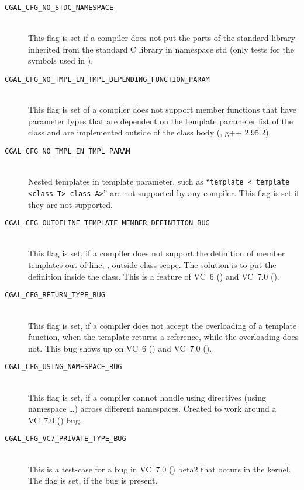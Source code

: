 \begin{description}
\item[{\tt CGAL\_CFG\_NO\_STDC\_NAMESPACE}]~\\ 
  This flag is set if a compiler does not put the parts of the
  standard library inherited from the standard C library in namespace
  {\ccFont std} (only tests for the symbols used in \cgal).
 
\item[{\tt CGAL\_CFG\_NO\_TMPL\_IN\_TMPL\_DEPENDING\_FUNCTION\_PARAM}]~\\
  This flag is set of a compiler does not support member functions
  that have parameter types that are dependent on the template
  parameter list of the class and are implemented outside of the class
  body (\eg, g++ 2.95.2).
  
\item[{\tt CGAL\_CFG\_NO\_TMPL\_IN\_TMPL\_PARAM}]~\\
  Nested templates in template parameter, such as ``\texttt{template <
    template <class T> class A>}'' are not supported by any compiler.
  This flag is set if they are not supported.

\item[{\tt CGAL\_CFG\_OUTOFLINE\_TEMPLATE\_MEMBER\_DEFINITION\_BUG}]~\\
  This flag is set, if a compiler does not support the definition of
  member templates out of line, \ie, outside class scope. The solution
  is to put the definition inside the class. This is a feature of VC~6
  () and VC~7.0 ().

\item[{\tt CGAL\_CFG\_RETURN\_TYPE\_BUG}]~\\
  This flag is set, if a compiler does not accept the overloading of a
  template function, when the template returns a reference, while the
  overloading does not. This bug shows up on VC~6 () and
  VC~7.0 ().

\item[{\tt CGAL\_CFG\_USING\_NAMESPACE\_BUG}]~\\
  This flag is set, if a compiler cannot handle using directives
  (using namespace \ldots) across different namespaces. Created to
  work around a VC~7.0 () bug.

\item[{\tt CGAL\_CFG\_VC7\_PRIVATE\_TYPE\_BUG}]~\\
  This is a test-case for a bug in VC~7.0 () beta2 that
  occurs in the kernel. The flag is set, if the bug is present.

\end{description}
